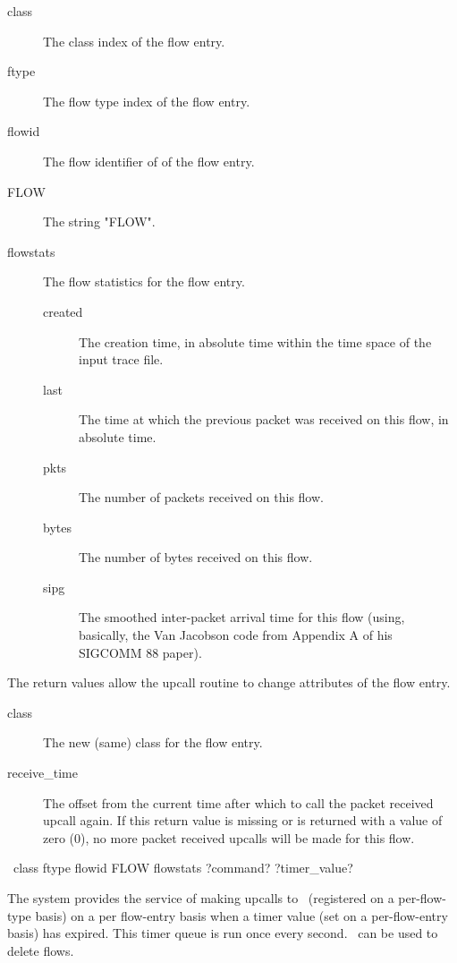 \documentclass{article}
\begin{document}
\begin{description}
\item[class] The class index of the flow entry.
\item[ftype] The flow type index of the flow entry.
\item[flowid] The flow identifier of of the flow entry.
\item[FLOW] The string "FLOW".
\item[flowstats] The flow statistics for the flow entry.
\begin{description}
\item[created] The creation time, in absolute time within the time
space of the input trace file.
\item[last] The time at which the previous packet was received on this
flow, in absolute time.
\item[pkts] The number of packets received on this flow.
\item[bytes] The number of bytes received on this flow.
\item[sipg] The smoothed inter-packet arrival time for this flow
(using, basically,
the Van Jacobson code from Appendix A of his SIGCOMM 88 paper).
\end{description}
\end{description}

The return values allow the upcall routine to change attributes of the
flow entry.

\begin{description}
\item[class]  The new (same) class for the flow entry.
\item[receive\_time] The offset from the current time after which to call
the packet received upcall again.  If this return value is missing or
is returned with a value of zero (0), no more packet received upcalls
will be made for this flow.
\end{description}

\manend

\label{sec:upcall_timer_expired}

\SYNOPSIS \cmdname\ class ftype flowid FLOW flowstats
\RETURNVALUES ?command? ?timer\_value?

The system provides the service of making upcalls to \cmdname\
(registered on a per-flow-type basis) on a per flow-entry basis when a
timer value (set on a per-flow-entry basis) has expired.  This timer
queue is run once every second.  \cmdname\ can be used to delete flows.
\end{document}
